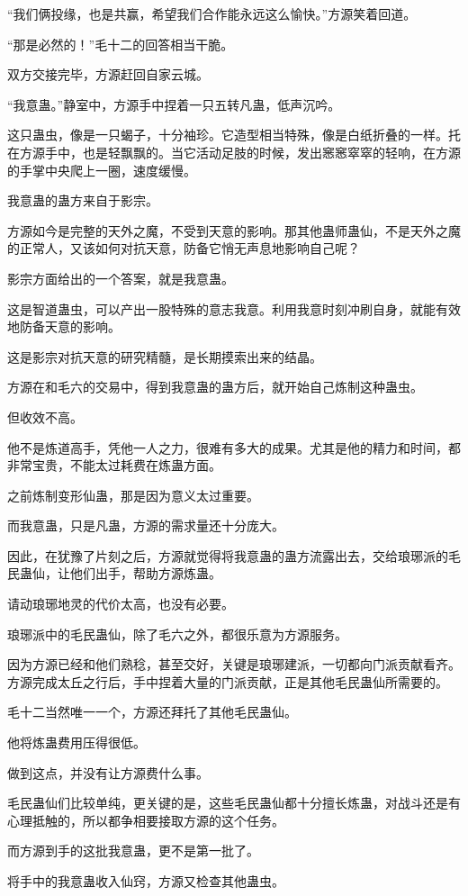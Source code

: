\begin{this_body}
“我们俩投缘，也是共赢，希望我们合作能永远这么愉快。”方源笑着回道。

“那是必然的！”毛十二的回答相当干脆。

双方交接完毕，方源赶回自家云城。

“我意蛊。”静室中，方源手中捏着一只五转凡蛊，低声沉吟。

这只蛊虫，像是一只蝎子，十分袖珍。它造型相当特殊，像是白纸折叠的一样。托在方源手中，也是轻飘飘的。当它活动足肢的时候，发出窸窸窣窣的轻响，在方源的手掌中央爬上一圈，速度缓慢。

我意蛊的蛊方来自于影宗。

方源如今是完整的天外之魔，不受到天意的影响。那其他蛊师蛊仙，不是天外之魔的正常人，又该如何对抗天意，防备它悄无声息地影响自己呢？

影宗方面给出的一个答案，就是我意蛊。

这是智道蛊虫，可以产出一股特殊的意志我意。利用我意时刻冲刷自身，就能有效地防备天意的影响。

这是影宗对抗天意的研究精髓，是长期摸索出来的结晶。

方源在和毛六的交易中，得到我意蛊的蛊方后，就开始自己炼制这种蛊虫。

但收效不高。

他不是炼道高手，凭他一人之力，很难有多大的成果。尤其是他的精力和时间，都非常宝贵，不能太过耗费在炼蛊方面。

之前炼制变形仙蛊，那是因为意义太过重要。

而我意蛊，只是凡蛊，方源的需求量还十分庞大。

因此，在犹豫了片刻之后，方源就觉得将我意蛊的蛊方流露出去，交给琅琊派的毛民蛊仙，让他们出手，帮助方源炼蛊。

请动琅琊地灵的代价太高，也没有必要。

琅琊派中的毛民蛊仙，除了毛六之外，都很乐意为方源服务。

因为方源已经和他们熟稔，甚至交好，关键是琅琊建派，一切都向门派贡献看齐。方源完成太丘之行后，手中捏着大量的门派贡献，正是其他毛民蛊仙所需要的。

毛十二当然唯一一个，方源还拜托了其他毛民蛊仙。

他将炼蛊费用压得很低。

做到这点，并没有让方源费什么事。

毛民蛊仙们比较单纯，更关键的是，这些毛民蛊仙都十分擅长炼蛊，对战斗还是有心理抵触的，所以都争相要接取方源的这个任务。

而方源到手的这批我意蛊，更不是第一批了。

将手中的我意蛊收入仙窍，方源又检查其他蛊虫。


\end{this_body}
